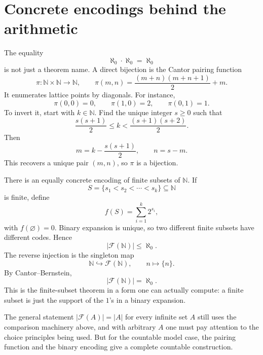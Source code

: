 \section{Concrete encodings behind the arithmetic}

The equality
\[
  \aleph_0\cdot\aleph_0=\aleph_0
\]
is not just a theorem name.  A direct bijection is the Cantor pairing function
\[
  \pi:\mathbb N\times\mathbb N\to\mathbb N,
  \qquad
  \pi(m,n)=\frac{(m+n)(m+n+1)}2+m.
\]
It enumerates lattice points by diagonals.  For instance,
\[
  \pi(0,0)=0,\qquad
  \pi(1,0)=2,\qquad
  \pi(0,1)=1.
\]
To invert it, start with \(k\in\mathbb N\).  Find the unique integer \(s\ge0\) such that
\[
  \frac{s(s+1)}2\le k<\frac{(s+1)(s+2)}2.
\]
Then
\[
  m=k-\frac{s(s+1)}2,\qquad n=s-m.
\]
This recovers a unique pair \((m,n)\), so \(\pi\) is a bijection.

There is an equally concrete encoding of finite subsets of \(\mathbb N\).  If
\[
  S=\{s_1<s_2<\cdots<s_k\}\subseteq\mathbb N
\]
is finite, define
\[
  f(S)=\sum_{i=1}^k2^{s_i},
\]
with \(f(\varnothing)=0\).  Binary expansion is unique, so two different finite subsets have different codes.  Hence
\[
  |\mathcal F(\mathbb N)|\le\aleph_0.
\]
The reverse injection is the singleton map
\[
  \mathbb N\hookrightarrow \mathcal F(\mathbb N),
  \qquad
  n\mapsto\{n\}.
\]
By Cantor--Bernstein,
\[
  |\mathcal F(\mathbb N)|=\aleph_0.
\]
This is the finite-subset theorem in a form one can actually compute: a finite subset is just the support of the \(1\)'s in a binary expansion.

\begin{remark}
The general statement \(|\mathcal F(A)|=|A|\) for every infinite set \(A\) still uses the comparison machinery above, and with arbitrary \(A\) one must pay attention to the choice principles being used.  But for the countable model case, the pairing function and the binary encoding give a complete countable construction.
\end{remark}
